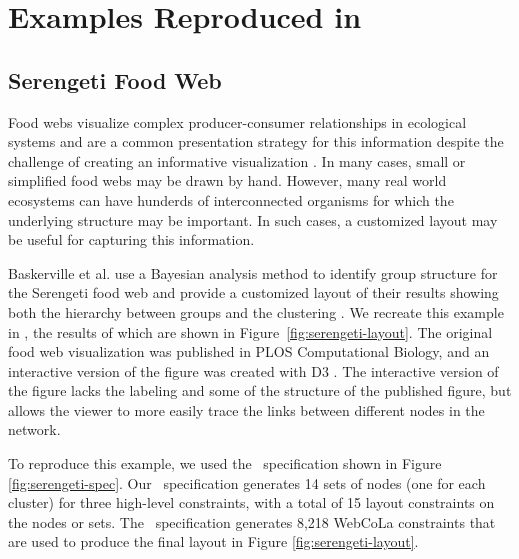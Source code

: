 \section{Examples Reproduced in \projectname}
\label{sec:examples}





\subsection{Serengeti Food Web}
\serengetiLayout
\serengetiSpec
Food webs visualize complex producer-consumer relationships in ecological systems and are a common presentation strategy for this information despite the challenge of creating an informative visualization . In many cases, small or simplified food webs may be drawn by hand. However, many real world ecosystems can have hunderds of interconnected organisms for which the underlying structure may be important. In such cases, a customized layout may be useful for capturing this information.

Baskerville et al. use a Bayesian analysis method to identify group structure for the Serengeti food web and provide a customized layout of their results showing both the hierarchy between groups and the clustering \cite{baskerville2011spatial}. We recreate this example in \projectname, the results of which are shown in Figure~\ref{fig:serengeti-layout}. The original food web visualization was published in PLOS Computational Biology, and an interactive version of the figure was created with D3 \cite{baskerville2011interactive}. The interactive version of the figure lacks the labeling and some of the structure of the published figure, but allows the viewer to more easily trace the links between different nodes in the network.

To reproduce this example, we used the \projectname~specification shown in Figure \ref{fig:serengeti-spec}. Our \projectname~specification generates 14 sets of nodes (one for each cluster) for three high-level constraints, with a total of 15 layout constraints on the nodes or sets. The \projectname~specification generates 8,218 WebCoLa constraints that are used to produce the final layout in Figure \ref{fig:serengeti-layout}.

